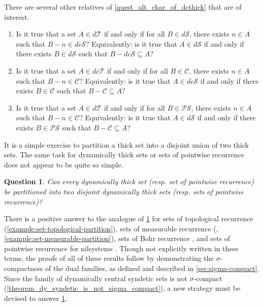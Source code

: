 \documentclass[letter,11pt]{article}
\theoremstyle{plain}
\newtheorem{question}[theorem]{Question}
\theoremstyle{definition}
\theoremstyle{plain}
\theoremstyle{plain}
\numberwithin{equation}{section}
\newcommand{\dsyndetic}{d\mathcal{S}}
\newcommand{\dthick}{d\mathcal{T}}
\newcommand{\dcsyndetic}{dc\mathcal{S}}
\newcommand{\dcthick}{dc\mathcal{T}}
\newcommand{\PS}{\mathcal{PS}}
\newcommand{\central}{\mathcal{C}}
\begin{document}
There are several other relatives of \cref{quest_alt_char_of_dcthick} that are of interest.
\begin{enumerate}
    \item Is it true that a set $A \in \dthick$ if and only if for all $B \in \dsyndetic$, there exists $n \in A$ such that $B-n \in \dcsyndetic$?  Equivalently: is it true that $A \in \dsyndetic$ if and only if there exists $B \in \dsyndetic$ such that $B - \dcsyndetic \subseteq A$?

    \item Is it true that a set $A \in \dcthick$ if and only if for all $B \in \central$, there exists $n \in A$ such that $B-n \in \central$?  Equivalently: is it true that $A \in \dcsyndetic$ if and only if there exists $B \in \central$ such that $B - \central \subseteq A$?

    \item Is it true that a set $A \in \dthick$ if and only if for all $B \in \PS$, there exists $n \in A$ such that $B-n \in \central$?  Equivalently: is it true that $A \in \dsyndetic$ if and only if there exists $B \in \PS$ such that $B - \central \subseteq A$?\\
\end{enumerate}



It is a simple exercise to partition a thick set into a disjoint union of two thick sets.  The same task for dynamically thick sets or sets of pointwise recurrence does not appear to be quite so simple.

\begin{question}
\label{ques:partition_into_two_pointwise_recurrence}
    Can every dynamically thick set (resp. set of pointwise recurrence) be partitioned into two disjoint dynamically thick sets (resp. sets of pointwise recurrence)?
\end{question}

There is a positive answer to the analogue of \cref{ques:partition_into_two_pointwise_recurrence} for sets of topological recurrence (\cref{example:set-topological-partition}), sets of measurable recurrence (\cite{Forrest_recurrence-in-dynamical-systems}, \cref{example:set-measurable-partition}), sets of Bohr recurrence \cite[Prop. 1.4]{Le-interpolation-first}, and sets of pointwise recurrence for nilsystems \cite[Lemma 3.3]{Le_interpolation_for_nilsequences}. Though not explicitly written in these terms, the proofs of all of these results follow by demonstrating the $\sigma$-compactness of the dual families, as defined and described in \cref{sec:sigma-compact}.  Since the family of dynamically central syndetic sets is not $\sigma$-compact (\cref{theorem_dy_syndetic_is_not_sigma_compact}), a new strategy must be devised to answer \cref{ques:partition_into_two_pointwise_recurrence}.\\
\end{document}

